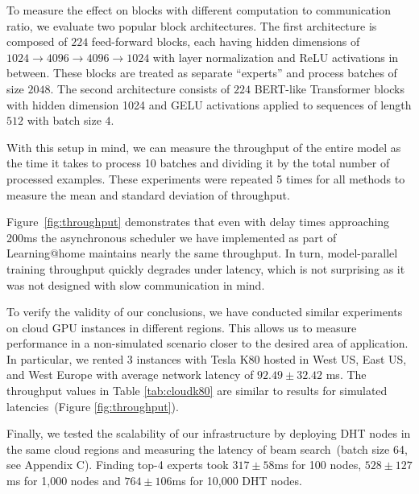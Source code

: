 \vspace{-1px}

To measure the effect on blocks with different computation to communication ratio, we evaluate two popular block architectures. The first architecture is composed of $224$ feed-forward blocks, each having hidden dimensions of $1024\to4096\to4096\to 1024$ with layer normalization and ReLU activations in between. These blocks are treated as separate ``experts'' and process batches of size $2048$. The second architecture consists of $224$ BERT-like Transformer blocks \cite{bert} with hidden dimension 1024 and GELU activations \cite{hendrycks2016gaussian} applied to sequences of length $512$ with batch size $4$.

\vspace{-1px}

With this setup in mind, we can measure the throughput of the entire model as the time it takes to process 10 batches and dividing it by the total number of processed examples. These experiments were repeated 5 times for all methods to measure the mean and standard deviation of throughput.

\vspace{-1px}

Figure~\ref{fig:throughput} demonstrates that even with delay times approaching 200ms the asynchronous scheduler we have implemented as part of Learning@home maintains nearly the same throughput. In turn, model-parallel training throughput quickly degrades under latency, which is not surprising as it was not designed with slow communication in mind. %

\vspace{-1px}

To verify the validity of our conclusions, we have conducted similar experiments on cloud GPU instances in different regions.
This allows us to measure performance in a non-simulated scenario closer to the desired area of application.
In particular, we rented 3 instances with Tesla K80 hosted in West US, East US, and West Europe with average network latency of $92.49\pm32.42$ ms. The throughput values in Table \ref{tab:cloudk80} are similar to results for simulated latencies~(Figure \ref{fig:throughput}). 

\vspace{-1px}
Finally, we tested the scalability of our infrastructure by deploying DHT nodes in the same cloud regions and measuring the latency of beam search~(batch size 64, see Appendix C). Finding top-4 experts took $317\pm58$ms for 100 nodes, $528\pm127$ms for 1,000 nodes and $764\pm106$ms for 10,000 DHT nodes.

